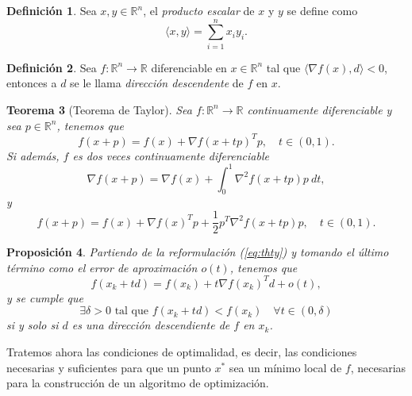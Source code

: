 \documentclass[11pt,a4paper]{book}
\newtheorem{theorem}{Teorema}[chapter]
\newtheorem{proposition}[theorem]{Proposición}
\theoremstyle{definition}
\newtheorem{definition}[theorem]{Definición}
\theoremstyle{remark}
\begin{document}
\begin{definition}
	Sea $x,y \in \mathbb{R}^n$, el \textit{producto escalar} de $x$ y $y$ se define como
	\begin{equation}
		\langle x,y \rangle = \sum_{i=1}^n x_i y_i.
	\end{equation}
\end{definition}

\begin{definition}
	Sea $f: \mathbb{R}^n \rightarrow \mathbb{R}$ diferenciable en
$x \in \mathbb{R}^n$ tal que $\langle \nabla f(x), d \rangle < 0$, entonces a $d$ se le llama \textit{dirección descendente} de $f$ en $x$.
\end{definition}

\begin{theorem}[Teorema de Taylor] %
	
	Sea $f: \mathbb{R}^n \rightarrow \mathbb{R}$ continuamente diferenciable y sea $p \in \mathbb{R}^n$, tenemos que 
	\begin{equation}
		f(x+p) = f(x) + \nabla f(x+tp)^Tp, \quad t\in (0,1).
	\end{equation}
	Si además, $f$ es dos veces continuamente diferenciable
	\begin{equation}
		\nabla f(x+p) = \nabla f(x)
		+ \int_0^1 \nabla^2 f(x+tp)p\:dt,
	\end{equation}
	y
	\begin{equation}
		f(x+p) = f(x) + \nabla f(x)^Tp
		+ \frac{1}{2}p^T \nabla^2 f(x+tp)p, \quad t\in (0,1).
		\label{eq:thty}
	\end{equation}
\end{theorem}


\begin{proposition}
Partiendo de la reformulación (\ref{eq:thty}) y tomando el último término
como el error de aproximación $o(t)$, tenemos que
\begin{equation}
	f(x_k + td) = f(x_k) + t \nabla f(x_k)^Td + o(t),
\end{equation}
y se cumple que
\begin{equation}
	\exists \delta > 0 \text{ tal que } f(x_k + td) < f(x_k)
	\quad \forall t \in (0, \delta)
\end{equation}
si y solo si $d$ es una dirección descendiente de $f$ en $x_k$.

\end{proposition}

Tratemos ahora las condiciones de optimalidad, es decir, las condiciones necesarias y suficientes para que un punto $x^*$ sea un mínimo local de $f$, necesarias para la
construcción de un algoritmo de optimización.
\end{document}
